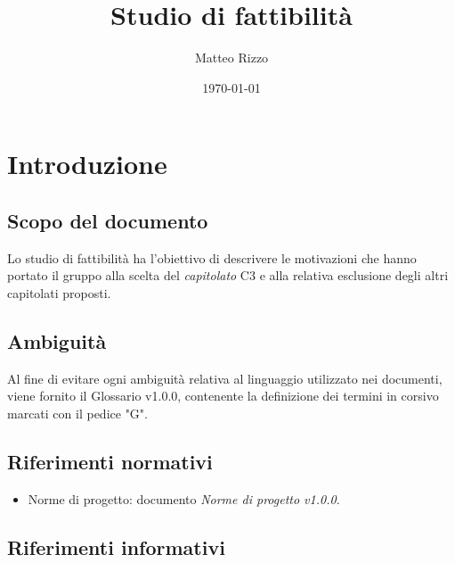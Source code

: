 \documentclass[openany,12pt,a4paper]{report}
\title{Studio di fattibilità}
\author{Matteo Rizzo}
\date{\today}
\begin{document}
\maketitle

 
\tableofcontents{}


\chapter{Introduzione}

\section{Scopo del documento}

Lo studio di fattibilità ha l’obiettivo di descrivere le motivazioni che hanno portato
il gruppo alla scelta del  \textit{capitolato} C3 e alla relativa esclusione degli altri
capitolati proposti.

\section{Ambiguità}

Al fine di evitare ogni ambiguità relativa al linguaggio utilizzato nei documenti, viene
fornito il Glossario v1.0.0, contenente la definizione dei termini in corsivo marcati con
il pedice "G".

\section{Riferimenti normativi}

\begin{itemize}

    \item{Norme di progetto:} documento \textit{Norme di progetto v1.0.0}.

\end{itemize}

\section{Riferimenti informativi}
\end{document}
